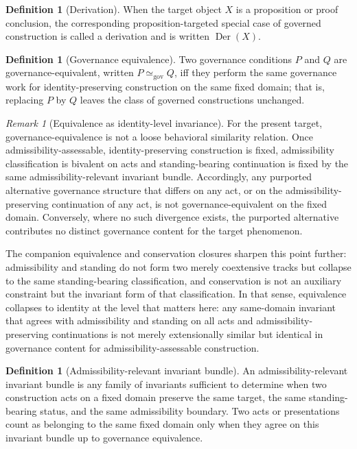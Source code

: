 \documentclass[11pt]{article}
\theoremstyle{definition}
\newtheorem{definition}[theorem]{Definition}
\theoremstyle{remark}
\newtheorem{remark}[theorem]{Remark}
\newcommand{\Der}{\operatorname{Der}}
\newcommand{\law}{\mathrel{\simeq_{\mathrm{gov}}}}
\begin{document}
\begin{definition}[Derivation]\label{def:derivation}
When the target object $X$ is a proposition or proof conclusion, the corresponding proposition-targeted special case of governed construction is called a derivation and is written $\Der(X)$.
\end{definition}

\begin{definition}[Governance equivalence]\label{def:governance-equivalence}
Two governance conditions $P$ and $Q$ are governance-equivalent, written $P \law Q$, iff they perform the same governance work for identity-preserving construction on the same fixed domain; that is, replacing $P$ by $Q$ leaves the class of governed constructions unchanged.
\end{definition}

\begin{remark}[Equivalence as identity-level invariance]
For the present target, governance-equivalence is not a loose behavioral similarity relation. Once admissibility-assessable, identity-preserving construction is fixed, admissibility classification is bivalent on acts and standing-bearing continuation is fixed by the same admissibility-relevant invariant bundle. Accordingly, any purported alternative governance structure that differs on any act, or on the admissibility-preserving continuation of any act, is not governance-equivalent on the fixed domain. Conversely, where no such divergence exists, the purported alternative contributes no distinct governance content for the target phenomenon.

The companion equivalence and conservation closures sharpen this point further: admissibility and standing do not form two merely coextensive tracks but collapse to the same standing-bearing classification, and conservation is not an auxiliary constraint but the invariant form of that classification. In that sense, equivalence collapses to identity at the level that matters here: any same-domain invariant that agrees with admissibility and standing on all acts and admissibility-preserving continuations is not merely extensionally similar but identical in governance content for admissibility-assessable construction.
\end{remark}

\begin{definition}[Admissibility-relevant invariant bundle]\label{def:invariant-bundle}
An admissibility-relevant invariant bundle is any family of invariants sufficient to determine when two construction acts on a fixed domain preserve the same target, the same standing-bearing status, and the same admissibility boundary. Two acts or presentations count as belonging to the same fixed domain only when they agree on this invariant bundle up to governance equivalence.
\end{definition}
\end{document}
